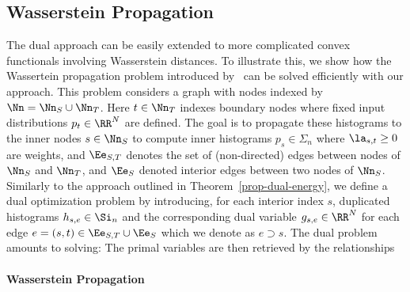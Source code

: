 

\subsection{Wasserstein Propagation}

The dual approach can be easily extended to more complicated convex functionals involving Wasserstein distances. To illustrate this, we show how the Wassertein propagation problem introduced by~\cite{Solomon-ICML} can be solved efficiently with our approach. This problem considers a graph with nodes indexed by $\Nn = \Nn_S \cup \Nn_T$. Here $t \in \Nn_T$ indexes boundary nodes where fixed input distributions $p_t \in \RR^N$ are defined. The goal is to propagate these histograms to the inner nodes $s \in \Nn_S$ to compute inner histograms $p_s \in \Sigma_n$
where $\la_{s,t} \geq 0$ are weights, and $\Ee_{S,T}$ denotes the set of (non-directed) edges between nodes of $\Nn_S$ and $\Nn_T$, and $\Ee_S$ denoted interior edges between two nodes of $\Nn_S$. Similarly to the approach outlined in Theorem~\ref{prop-dual-energy}, we define a dual optimization problem by introducing, for each interior index $s$, duplicated histograms $h_{s,e} \in \Si_n$ and the corresponding dual variable $g_{s,e} \in \RR^N$ for each edge $e=(s,t) \in \Ee_{S,T} \cup \Ee_S$ which we denote as $e \supset s$. The dual problem amounts to solving:
The primal variables are then retrieved by the relationships



\paragraph{Wasserstein Propagation}

